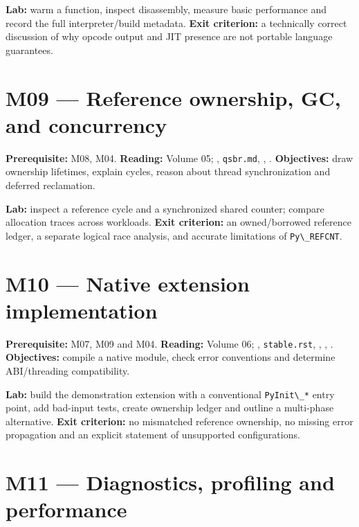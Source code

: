 \documentclass[
  11pt,
]{report}
\newcommand{\passthrough}[1]{#1}
\begin{document}
\textbf{Lab:} warm a function, inspect disassembly, measure basic
performance and record the full interpreter/build metadata. \textbf{Exit
criterion:} a technically correct discussion of why opcode output and
JIT presence are not portable language guarantees.

\section{M09 --- Reference ownership, GC, and
concurrency}\label{m09-reference-ownership-gc-and-concurrency}

\textbf{Prerequisite:} M08, M04. \textbf{Reading:} Volume 05;
,
\passthrough{\lstinline!qsbr.md!},
,
.
\textbf{Objectives:} draw ownership lifetimes, explain cycles, reason
about thread synchronization and deferred reclamation.

\textbf{Lab:} inspect a reference cycle and a synchronized shared
counter; compare allocation traces across workloads. \textbf{Exit
criterion:} an owned/borrowed reference ledger, a separate logical race
analysis, and accurate limitations of
\passthrough{\lstinline!Py\_REFCNT!}.

\section{M10 --- Native extension
implementation}\label{m10-native-extension-implementation}

\textbf{Prerequisite:} M07, M09 and M04. \textbf{Reading:} Volume 06;
,
\passthrough{\lstinline!stable.rst!},
,
,
.
\textbf{Objectives:} compile a native module, check error conventions
and determine ABI/threading compatibility.

\textbf{Lab:} build the demonstration extension with a conventional
\passthrough{\lstinline!PyInit\_*!} entry point, add bad-input tests,
create ownership ledger and outline a multi-phase alternative.
\textbf{Exit criterion:} no mismatched reference ownership, no missing
error propagation and an explicit statement of unsupported
configurations.

\section{M11 --- Diagnostics, profiling and
performance}\label{m11-diagnostics-profiling-and-performance}
\end{document}
